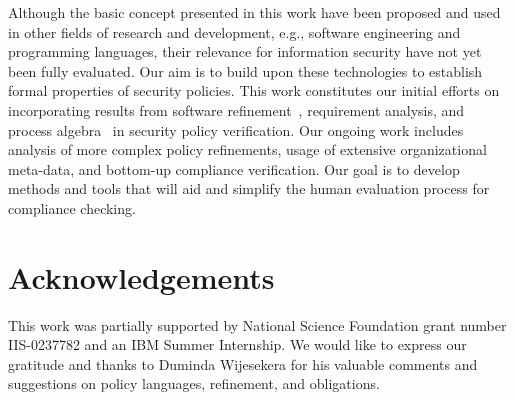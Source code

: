 \documentclass[12pt,journal,letterpaper,onecolumn]{IEEEtran}
\begin{document}
Although the basic concept presented in this work have been proposed
and used in other fields of research and development, e.g., software
engineering and programming languages, their relevance for
information security have not yet been fully evaluated.  Our aim is
to build upon these technologies to establish formal properties of
security policies.  This work constitutes our initial efforts on
incorporating results from software
refinement~\cite{Dijkstra71,Wirth71}, requirement analysis, and
process
algebra~\cite{Baeten90,Bergstra84,Bergstra85,Hoare78,Hoare85,Milner82,Glabbeek01}
in security policy verification. Our ongoing work includes analysis
of more complex policy refinements, usage of extensive
organizational meta-data, and bottom-up compliance verification. Our
goal is to develop methods and tools that will aid and simplify the
human evaluation process for compliance checking.


\section{Acknowledgements}
\noindent This work was partially supported by National Science
Foundation grant number IIS-0237782 and an IBM Summer Internship.
We would like to express our gratitude and thanks to Duminda
Wijesekera for his valuable comments and suggestions on policy
languages, refinement, and obligations.



\end{document}

